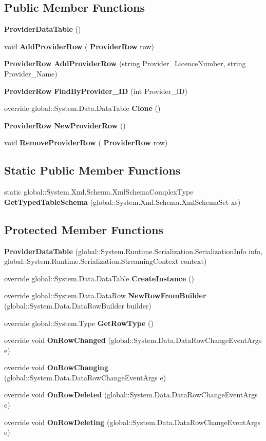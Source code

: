 \subsection*{Public Member Functions}
\begin{DoxyCompactItemize}
\item 
\textbf{ Provider\+Data\+Table} ()
\item 
void \textbf{ Add\+Provider\+Row} (\textbf{ Provider\+Row} row)
\item 
\textbf{ Provider\+Row} \textbf{ Add\+Provider\+Row} (string Provider\+\_\+\+Licence\+Number, string Provider\+\_\+\+Name)
\item 
\textbf{ Provider\+Row} \textbf{ Find\+By\+Provider\+\_\+\+ID} (int Provider\+\_\+\+ID)
\item 
override global\+::\+System.\+Data.\+Data\+Table \textbf{ Clone} ()
\item 
\textbf{ Provider\+Row} \textbf{ New\+Provider\+Row} ()
\item 
void \textbf{ Remove\+Provider\+Row} (\textbf{ Provider\+Row} row)
\end{DoxyCompactItemize}
\subsection*{Static Public Member Functions}
\begin{DoxyCompactItemize}
\item 
static global\+::\+System.\+Xml.\+Schema.\+Xml\+Schema\+Complex\+Type \textbf{ Get\+Typed\+Table\+Schema} (global\+::\+System.\+Xml.\+Schema.\+Xml\+Schema\+Set xs)
\end{DoxyCompactItemize}
\subsection*{Protected Member Functions}
\begin{DoxyCompactItemize}
\item 
\textbf{ Provider\+Data\+Table} (global\+::\+System.\+Runtime.\+Serialization.\+Serialization\+Info info, global\+::\+System.\+Runtime.\+Serialization.\+Streaming\+Context context)
\item 
override global\+::\+System.\+Data.\+Data\+Table \textbf{ Create\+Instance} ()
\item 
override global\+::\+System.\+Data.\+Data\+Row \textbf{ New\+Row\+From\+Builder} (global\+::\+System.\+Data.\+Data\+Row\+Builder builder)
\item 
override global\+::\+System.\+Type \textbf{ Get\+Row\+Type} ()
\item 
override void \textbf{ On\+Row\+Changed} (global\+::\+System.\+Data.\+Data\+Row\+Change\+Event\+Args e)
\item 
override void \textbf{ On\+Row\+Changing} (global\+::\+System.\+Data.\+Data\+Row\+Change\+Event\+Args e)
\item 
override void \textbf{ On\+Row\+Deleted} (global\+::\+System.\+Data.\+Data\+Row\+Change\+Event\+Args e)
\item 
override void \textbf{ On\+Row\+Deleting} (global\+::\+System.\+Data.\+Data\+Row\+Change\+Event\+Args e)
\end{DoxyCompactItemize}

